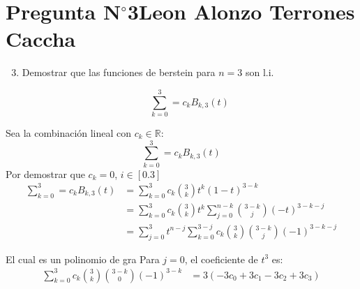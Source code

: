 \section{Pregunta N$^{\circ}$3\qquad Leon Alonzo Terrones Caccha}

\begin{frame}
    \begin{enumerate}\setcounter{enumi}{2}
        \item
              Demostrar que las funciones de berstein para $n=3$ son l.i.


              \[\sum_{k=0}^{3}=c_{k}B_{k,3}(t)\]
              \begin{comment}
              \end{comment}
    \end{enumerate}

    \begin{solution}

        Sea la combinación lineal con $c_k\in\mathbb{R}:$
        \[\sum_{k=0}^{3}=c_{k}B_{k,3}(t)\]
        Por demostrar que $c_k=0$, $i\in[0.3]$
        \begin{align*}
            \sum_{k=0}^{3}=c_{k}B_{k,3}(t) & =\sum_{k=0}^{3}c_k\binom{3}{k}t^k(1-t)^{3-k}                                        \\
                                           & =\sum_{k=0}^{3}{c_k\binom{3}{k}t^k\sum_{j=0}^{n-k}\binom{3-k}{j}{(-t)^{3-k-j}}}     \\
                                           & =\sum_{j=0}^{3}{t^{n-j}\sum_{k=0}^{3-j}{c_k\binom{3}{k}\binom{3-k}{j}(-1)^{3-k-j}}}
        \end{align*}

        El cual es un polinomio de gra
        Para $j=0$, el coeficiente de $t^3$ es:
        \begin{align*}
            \sum_{k=0}^{3}{c_k\binom{3}{k}\binom{3-k}{0}(-1)^{3-k}} & =3(-3c_0+3c_1-3c_2+3c_3)
        \end{align*}


    \end{solution}
\end{frame}